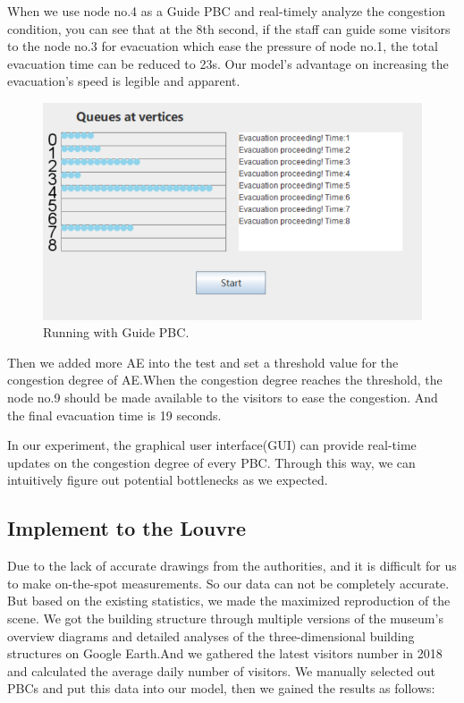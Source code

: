 \documentclass[12pt]{article}
\begin{document}
When we use node no.4 as a Guide PBC and real-timely analyze the congestion condition, 
you can see that at the 8th second, if the staff can guide 
some visitors to the node no.3 for evacuation which ease the pressure of node no.1,
the total evacuation time can be reduced to 23s. Our model's advantage on 
increasing the evacuation's speed is legible and apparent. 

\begin{figure}[ht]
	\centering
	\includegraphics[scale=0.4]{figure10.png}
	\caption{Running with Guide PBC.}
	\label{fig:fig9}
\end{figure}

Then we added more AE into the test and set a threshold value for the congestion degree of AE.When the congestion degree reaches the threshold, the node no.9 should be made available to the visitors to ease the congestion. And the final evacuation time is 19 seconds.  

In our experiment, the graphical user interface(GUI) can 
provide real-time updates on the congestion degree of every PBC. Through this way, we can intuitively figure out potential bottlenecks as we expected.
\subsection{Implement to the Louvre}
Due to the lack of accurate drawings from the authorities, and it is difficult 
for us to make on-the-spot measurements. So our data can not be completely 
accurate. But based on the existing statistics, we made the maximized 
reproduction of the scene. We got the building structure through multiple versions of the museum's 
overview diagrams and detailed analyses of the three-dimensional building 
structures on Google Earth.And we gathered the latest visitors number in 2018 
and calculated the average daily number of visitors. We manually selected out
PBCs and put this data into our model, then we 
gained the results as follows:
\end{document}
